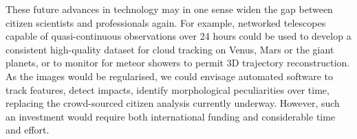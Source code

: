 \documentclass{ar2e}
\begin{document}
These future advances in technology may in one sense widen the gap between
citizen scientists and professionals again. For example, networked telescopes
capable of quasi-continuous observations over 24 hours could be used to develop
a consistent high-quality dataset for cloud tracking on Venus, Mars or the giant
planets, or to monitor for meteor showers to permit 3D trajectory
reconstruction.   As the images would be regularised, we could envisage
automated software to track features, detect impacts, identify morphological
peculiarities over time, replacing the crowd-sourced citizen analysis currently
underway.  However, such an investment would require both international funding
and considerable time and effort.






\end{document}
